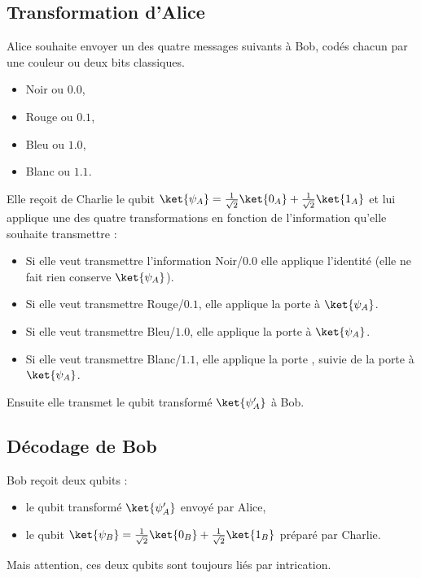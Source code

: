 \documentclass[11pt,class=report,crop=false]{standalone}
\begin{document}
\subsection{Transformation d'Alice}

Alice souhaite envoyer un des quatre messages suivants à Bob, codés chacun par une couleur ou deux bits classiques.
\begin{itemize}
  \item \og{}Noir\fg{} ou $0.0$,
  \item \og{}Rouge\fg{} ou $0.1$,  
  \item \og{}Bleu\fg{} ou $1.0$,
  \item \og{}Blanc\fg{} ou $1.1$.
\end{itemize}

Elle reçoit de Charlie le qubit $\ket{\psi_A} = \frac1{\sqrt2} \ket{0_A} + \frac1{\sqrt2} \ket{1_A}$
et lui applique une des quatre transformations en fonction de l'information qu'elle souhaite transmettre :
\begin{itemize}
  \item Si elle veut transmettre l'information \og{}Noir/$0.0$\fg{} elle applique l'identité  (elle ne fait rien conserve $\ket{\psi_A}$).
  \item Si elle veut transmettre \og{}Rouge/$0.1$\fg{}, elle applique la porte  à $\ket{\psi_A}$.
  \item Si elle veut transmettre \og{}Bleu/$1.0$\fg{}, elle applique la porte  à $\ket{\psi_A}$.
  \item Si elle veut transmettre \og{}Blanc/$1.1$\fg{}, elle applique la porte , suivie de la porte   à $\ket{\psi_A}$.
\end{itemize}

Ensuite elle transmet le qubit transformé $\ket{\psi'_A}$ à Bob.





\subsection{Décodage de Bob}

Bob reçoit deux qubits :
\begin{itemize}
  \item le qubit transformé $\ket{\psi'_A}$ envoyé par Alice,
  \item le qubit $\ket{\psi_B} = \frac1{\sqrt2} \ket{0_B} + \frac1{\sqrt2} \ket{1_B}$ préparé par Charlie.
\end{itemize}
Mais attention, ces deux qubits sont toujours liés par intrication.
\end{document}
